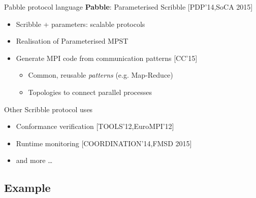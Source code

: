 \documentclass[xcolor={dvipsnames}]{beamer}
\newcommand{\bib}[1]{\textcolor{black!60}{\footnotesize [#1]}}
\begin{document}
\begin{frame}{Pabble protocol language}
  \textbf{Pabble}: Parameterised Scribble \bib{PDP'14,SoCA 2015}
  \begin{itemize}
    \item Scribble + parameters: scalable protocols
    \item Realisation of Parameterised MPST
    \item Generate MPI code from communication patterns \bib{CC'15}
      \begin{itemize}
        \item Common, reusable \textit{patterns} (e.g. Map-Reduce)
        \item Topologies to connect parallel processes
      \end{itemize}
  \end{itemize}
  Other Scribble protocol uses
  \begin{itemize}
    \item Conformance verification \bib{TOOLS'12,EuroMPI'12}
    \item Runtime monitoring \bib{COORDINATION'14,FMSD 2015}
    \item and more \dots
  \end{itemize}
\end{frame}

\subsection{Example}
\end{document}
